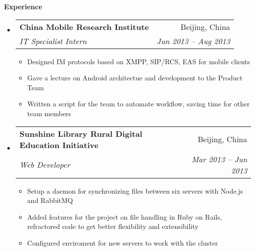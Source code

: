 \documentclass[letterpaper,11pt,adobefonts]{ctexart}
\makeatletter
\newcommand{\resitem}[1]{\item #1 \vspace{-2pt}}
\newcommand{\resheading}[1]{{\large \colorbox{mygrey}{\begin{minipage}{\textwidth}{\textbf{#1 \vphantom{p\^{E}}}}\end{minipage}}}}
\newcommand{\ressubheading}[4]{
\begin{tabular*}{6.5in}{l@{\extracolsep{\fill}}r}
        \textbf{#1} & #2 \\
        \textit{#3} & \textit{#4} \\
\end{tabular*}\vspace{-6pt}}
\makeatother
\begin{document}
\resheading{Experience}
    \begin{itemize}
        \item 
            \ressubheading{{China Mobile Research Institute}}{Beijing, China}
                {IT Specialist Intern}{Jun 2013 -- Aug 2013}
                { \footnotesize
                \begin{itemize}

                        \resitem{Designed IM protocols based on XMPP, SIP/RCS, EAS for mobile clients}
                        \resitem{Gave a lecture on Android architectue and development to the Product Team}
                        \resitem{Written a script for the team to automate workflow, saving time for other team members}
                \end{itemize}
                }
        \item 
            \ressubheading{{Sunshine Library Rural Digital Education Initiative}}{Beijing, China}{Web Developer}{Mar 2013 -- Jun 2013}
                { \footnotesize
                \begin{itemize}
                        \resitem{Setup a daemon for synchronizing files between six servers with Node.js and RabbitMQ}
                        \resitem{Added features for the project on file handling in Ruby on Rails, refractored code to get better flexibility and extensibility}
                        \resitem{Configured enviroment for new servers to work with the cluster}
                \end{itemize}
                }
    \end{itemize}  %
\end{document}

